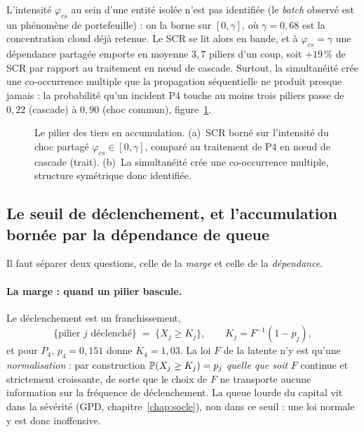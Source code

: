 L'intensité $\varphi_{cs}$ au sein d'une entité isolée n'est pas identifiée (le \emph{batch}
observé est un phénomène de portefeuille) : on la borne sur $[0,\gamma]$, où $\gamma=0{,}68$
est la concentration cloud déjà retenue. Le SCR se lit alors en bande, et à
$\varphi_{cs}=\gamma$ une dépendance partagée emporte en moyenne $3{,}7$ piliers d'un coup,
soit $+19\,\%$ de SCR par rapport au traitement en n\oe{}ud de cascade. Surtout, la
simultanéité crée une co-occurrence multiple que la propagation séquentielle ne produit
presque jamais : la probabilité qu'un incident P4 touche au moins trois piliers passe de
$0{,}22$ (cascade) à $0{,}90$ (choc commun), figure~\ref{fig:p4}.

\begin{figure}[htbp]\centering
{}
\caption{Le pilier des tiers en accumulation. (a)~SCR borné sur l'intensité du choc partagé
$\varphi_{cs}\in[0,\gamma]$, comparé au traitement de P4 en n\oe{}ud de cascade (trait).
(b)~La simultanéité crée une co-occurrence multiple, structure symétrique donc identifiée.
}
\label{fig:p4}
\end{figure}

\subsection{Le seuil de déclenchement, et l'accumulation bornée par la dépendance de queue}
\label{sec:p4-seuil}

Il faut séparer deux questions, celle de la \emph{marge} et celle de la \emph{dépendance}.

\paragraph{La marge : quand un pilier bascule.} Le déclenchement est un franchissement,
\begin{equation}
  \{\text{pilier } j \text{ déclenché}\} \;=\; \{X_j \ge K_j\},
  \qquad K_j = F^{-1}(1-p_j),
  \label{eq:seuil-Kj}
\end{equation}
et pour $P_4$, $p_4=0{,}151$ donne $K_4=1{,}03$. La loi $F$ de la latente n'y est qu'une
\emph{normalisation} : par construction $\mathbb{P}(X_j\ge K_j)=p_j$ \emph{quelle que soit} $F$
continue et strictement croissante, de sorte que le choix de $F$ ne transporte aucune information
sur la fréquence de déclenchement. La queue lourde du capital vit dans la sévérité (GPD,
chapitre~\ref{chap:socle}), non dans ce seuil : une loi normale y est donc inoffensive.

